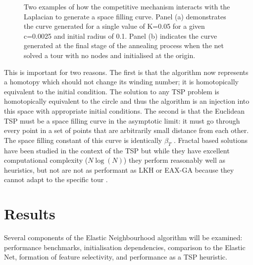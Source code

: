 \begin{figure}[h!]
\begin{subfigure}{0.4\textwidth}
		\caption{}
	\end{subfigure}
	\def\c{Two examples of how the competitive mechanism interacts with the Laplacian to generate a space filling curve. }
	\caption[\c]{\label{fig:selffillingcurve} \c Panel (a) demonstrates the curve generated for a single value of K=0.05 for a given c=0.0025 and initial radius of 0.1. Panel (b) indicates the curve generated at the final stage of the annealing process when the net solved a tour with no nodes and initialised at the origin.}
\end{figure}
\FloatBarrier
This is important for two reasons. The first is that the algorithm now represents a homotopy which should not change its winding number; it is homotopically equivalent to the initial condition. The solution to any TSP problem is homotopically equivalent to the circle and thus the algorithm is an injection into this space with appropriate initial conditions. The second is that the Euclidean TSP must be a space filling curve in the asymptotic limit: it must go through every point in a set of points that are arbitrarily small distance from each other. The space filling constant of this curve is identically $\beta_T$ \cite{Beardwood1959-wb}. Fractal based solutions have been studied in the context of the TSP but while they have excellent computational complexity ($N \log(N)$) they perform reasonably well as heuristics, but not are not as performant as LKH or EAX-GA because they cannot adapt to the specific tour \cite{Bartholdi1988-fe, Bartholdi1982-kt, Platzman1989-gc, Moscato1994-nf}.  
\section{Results}
Several components of the Elastic Neighbourhood algorithm will be examined: performance benchmarks, initialisation dependencies, comparison to the Elastic Net, formation of feature selectivity, and performance as a TSP heuristic. 
